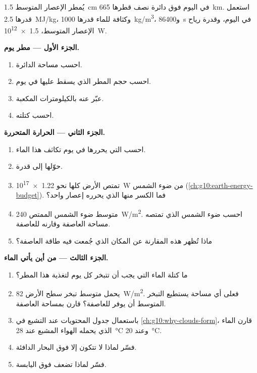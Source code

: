 \begin{problem}
\label{pb:g10:storms-and-cyclones:1}
يُمطر الإعصار المتوسط \qty{1.5}{cm} في اليوم فوق دائرة نصف قطرها
\qty{665}{km}. استعمل  قدرها \qty{2.5}{MJ/kg}، وكثافة للماء قدرها
\qty{1000}{kg/m^3}، و\qty{86400}{s} في اليوم، وقدرة رياح الإعصار المتوسط،
\qty{1.5e12}{W}.

\medskip
\noindent\textbf{الجزء الأول --- مطر يوم.}
\begin{enumerate}
  \item احسب مساحة الدائرة.
  \item احسب حجم المطر الذي يسقط عليها في يوم.
  \item عبّر عنه بالكيلومترات المكعبة.
  \item احسب كتلته.
\end{enumerate}

\medskip
\noindent\textbf{الجزء الثاني --- الحرارة المتحررة.}
\begin{enumerate}[resume]
  \item احسب  التي يحررها في يوم تكاثف هذا
        الماء.
  \item حوّلها إلى قدرة.
  \item تمتص الأرض كلها نحو \qty{1.22e17}{W} من ضوء الشمس
        (\cref{ch:g10:earth-energy-budget}). فما الكسر منها الذي يحرره
        إعصار واحد؟
  \item متوسط ضوء الشمس الممتص \qty{240}{W/m^2}. احسب ضوء الشمس الذي
        تمتصه مساحة العاصفة وقارنه 
        للعاصفة.
  \item ماذا تُظهر هذه المقارنة عن المكان الذي جُمعت فيه طاقة
        العاصفة؟
\end{enumerate}

\medskip
\noindent\textbf{الجزء الثالث --- من أين يأتي الماء.}
\begin{enumerate}[resume]
  \item ما كتلة الماء التي يجب أن تتبخر كل يوم لتغذية هذا المطر؟
  \item يحمل متوسط تبخر سطح الأرض
        \qty{82}{W/m^2}. فعلى أي مساحة يستطيع التبخر المتوسط أن يوفر
         للعاصفة؟ قارن بمساحة العاصفة.
  \item باستعمال جدول المحتويات عند التشبع في
        \cref{ch:g10:why-clouds-form}، قارن الماء الذي يحمله الهواء المشبع
        عند \qty{28}{\degreeCelsius} وعند \qty{20}{\degreeCelsius}.
  \item فسّر لماذا لا تتكون  إلا فوق البحار الدافئة.
  \item فسّر لماذا تضعف فوق اليابسة.
\end{enumerate}


\end{problem}
